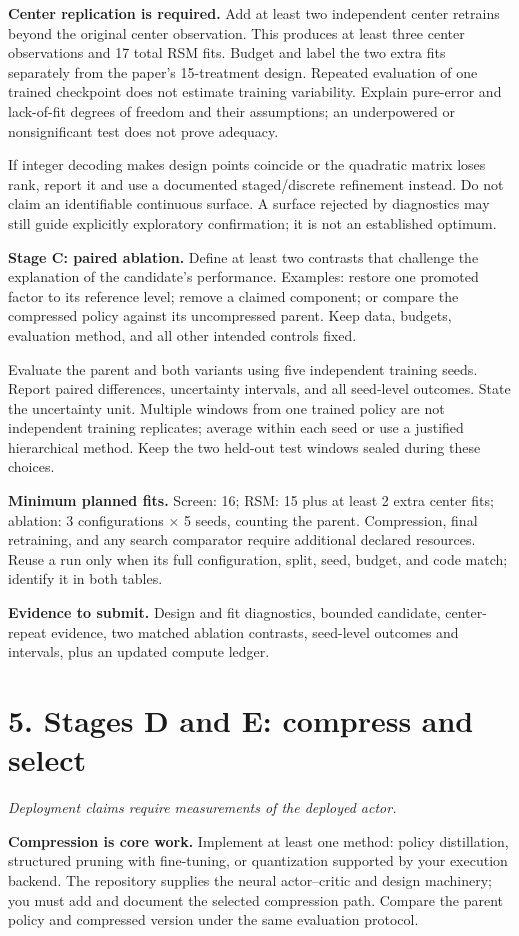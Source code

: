 \documentclass[11pt,letterpaper]{article}
\newcommand{\pageheading}[2]{\section*{\color{navy}#1}\textit{#2}\par}
\newcommand{\deliver}[1]{\medskip\textbf{Evidence to submit.} #1}
\begin{document}
\textbf{Center replication is required.} Add at least two independent center retrains beyond the original center observation. This produces at least three center observations and 17 total RSM fits. Budget and label the two extra fits separately from the paper's 15-treatment design. Repeated evaluation of one trained checkpoint does not estimate training variability. Explain pure-error and lack-of-fit degrees of freedom and their assumptions; an underpowered or nonsignificant test does not prove adequacy.

If integer decoding makes design points coincide or the quadratic matrix loses rank, report it and use a documented staged/discrete refinement instead. Do not claim an identifiable continuous surface. A surface rejected by diagnostics may still guide explicitly exploratory confirmation; it is not an established optimum.

\textbf{Stage C: paired ablation.} Define at least two contrasts that challenge the explanation of the candidate's performance. Examples: restore one promoted factor to its reference level; remove a claimed component; or compare the compressed policy against its uncompressed parent. Keep data, budgets, evaluation method, and all other intended controls fixed.

Evaluate the parent and both variants using five independent training seeds. Report paired differences, uncertainty intervals, and all seed-level outcomes. State the uncertainty unit. Multiple windows from one trained policy are not independent training replicates; average within each seed or use a justified hierarchical method. Keep the two held-out test windows sealed during these choices.

\textbf{Minimum planned fits.} Screen: 16; RSM: 15 plus at least 2 extra center fits; ablation: 3 configurations $\times$ 5 seeds, counting the parent. Compression, final retraining, and any search comparator require additional declared resources. Reuse a run only when its full configuration, split, seed, budget, and code match; identify it in both tables.

\deliver{Design and fit diagnostics, bounded candidate, center-repeat evidence, two matched ablation contrasts, seed-level outcomes and intervals, plus an updated compute ledger.}

\newpage
\pageheading{5. Stages D and E: compress and select}{Deployment claims require measurements of the deployed actor.}
\textbf{Compression is core work.} Implement at least one method: policy distillation, structured pruning with fine-tuning, or quantization supported by your execution backend. The repository supplies the neural actor--critic and design machinery; you must add and document the selected compression path. Compare the parent policy and compressed version under the same evaluation protocol.
\end{document}
